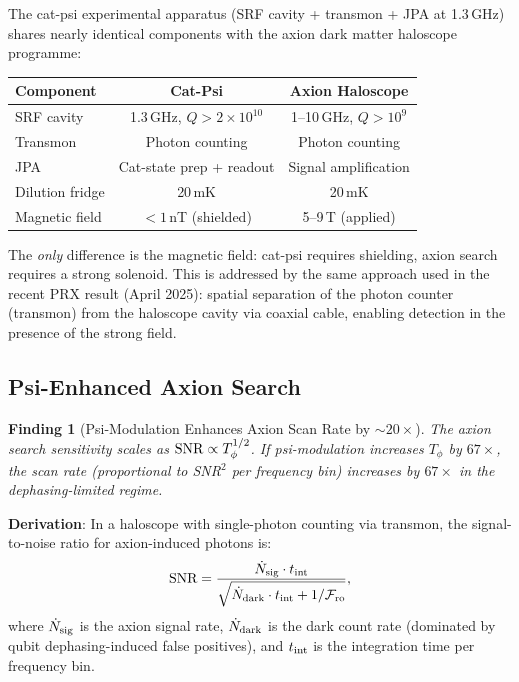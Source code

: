 \documentclass[11pt]{article}
\newtheorem{finding}[theorem]{Finding}
\theoremstyle{definition}
\theoremstyle{remark}
\newcommand{\ee}[1]{\times 10^{#1}}
\begin{document}
The cat-psi experimental apparatus (SRF cavity + transmon + JPA at
1.3\,GHz) shares nearly identical components with the axion dark
matter haloscope programme:

\begin{center}
\begin{tabular}{@{}lcc@{}}
\toprule
\textbf{Component} & \textbf{Cat-Psi} & \textbf{Axion Haloscope} \\
\midrule
SRF cavity & 1.3\,GHz, $Q > 2\ee{10}$ & 1--10\,GHz, $Q > 10^9$ \\
Transmon & Photon counting & Photon counting \\
JPA & Cat-state prep + readout & Signal amplification \\
Dilution fridge & 20\,mK & 20\,mK \\
Magnetic field & $< 1$\,nT (shielded) & 5--9\,T (applied) \\
\bottomrule
\end{tabular}
\end{center}

The \emph{only} difference is the magnetic field: cat-psi requires
shielding, axion search requires a strong solenoid. This is addressed
by the same approach used in the recent PRX result (April 2025): spatial
separation of the photon counter (transmon) from the haloscope cavity
via coaxial cable, enabling detection in the presence of the strong field.

\subsection{Psi-Enhanced Axion Search}

\begin{finding}[Psi-Modulation Enhances Axion Scan Rate by $\sim 20\times$]
\label{thm:axion}
The axion search sensitivity scales as ${\rm SNR} \propto T_\phi^{1/2}$.
If psi-modulation increases $T_\phi$ by $67\times$, the scan rate
(proportional to SNR$^2$ per frequency bin) increases by $67\times$
in the dephasing-limited regime.
\end{finding}

\textbf{Derivation}: In a haloscope with single-photon counting via
transmon, the signal-to-noise ratio for axion-induced photons is:
\begin{equation}
\text{SNR} = \frac{\dot{N}_{\rm sig} \cdot t_{\rm int}}
{\sqrt{\dot{N}_{\rm dark} \cdot t_{\rm int} + 1/\mathcal{F}_{\rm ro}}},
\end{equation}
where $\dot{N}_{\rm sig}$ is the axion signal rate, $\dot{N}_{\rm dark}$
is the dark count rate (dominated by qubit dephasing-induced false
positives), and $t_{\rm int}$ is the integration time per frequency bin.
\end{document}
